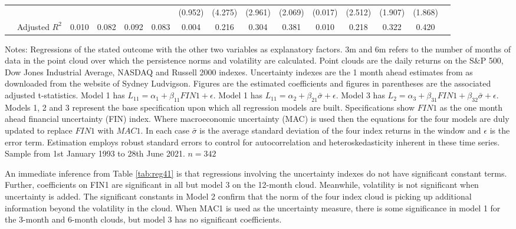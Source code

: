 \documentclass{article}
\begin{document}
\begin{sidewaystable}
\begin{center}
\begin{tabular}{ll l c c c c c c c c c c c c c}
            &&&&&&&(0.952)&(4.275)&(2.961)&(2.069)&(0.017)&(2.512)&(1.907)&(1.868)\\
            & \multicolumn{2}{l}{Adjusted $R^2$} & 0.010&0.082&0.092&0.083&0.004&0.216&0.304&0.381&0.010&0.218&0.322&0.420\\ 
             \hline
        \end{tabular}
    \end{center}
\footnotesize{Notes: Regressions of the stated outcome with the other two variables as explanatory factors. 3m and 6m refers to the number of months of data in the point cloud over which the persistence norms and volatility are calculated. Point clouds are the daily returns on the S\&P 500, Dow Jones Industrial Average, NASDAQ and Russell 2000 indexes. Uncertainty indexes are the 1 month ahead estimates from \cite{jurado2015measuring} as downloaded from the website of Sydney Ludvigson. Figures are the estimated coefficients and figures in parentheses are the associated \cite{newey1987simple} adjusted t-statistics. Model 1 has $L_{11} = \alpha_1 + \beta_{11}FIN1 + \epsilon$. Model 1 has $L_{11} = \alpha_2 + \beta_{21}\bar{\sigma} + \epsilon$. Model 3 has $L_{2} = \alpha_3 + \beta_{31}FIN1 + \beta_{32}\bar{\sigma} + \epsilon$. Models 1, 2 and 3 represent the base specification upon which all regression models are built. Specifications show $FIN1$ as the one month ahead financial uncertainty (FIN) index. Where macroeconomic uncertainty (MAC) is used then the equations for the four models are duly updated to replace $FIN1$ with $MAC1$. In each case $\bar{\sigma}$ is the average standard deviation of the four index returns in the window and $\epsilon$ is the error term. Estimation employs \cite{newey1987simple} robust standard errors to control for autocorrelation and heteroskedasticity inherent in these time series. Sample from 1st January 1993 to 28th June 2021. $n=342$}
\end{sidewaystable}


An immediate inference from Table \ref{tab:reg41} is that regressions involving the uncertainty indexes do not have significant constant terms. Further, coefficients on FIN1 are significant in all but model 3 on the 12-month cloud. Meanwhile, volatility is not significant when uncertainty is added. The significant constants in Model 2 confirm that the norm of the four index cloud is picking up additional information beyond the volatility in the cloud. When MAC1 is used as the uncertainty measure, there is some significance in model 1 for the 3-month and 6-month clouds, but model 3 has no significant coefficients.
\end{document}
